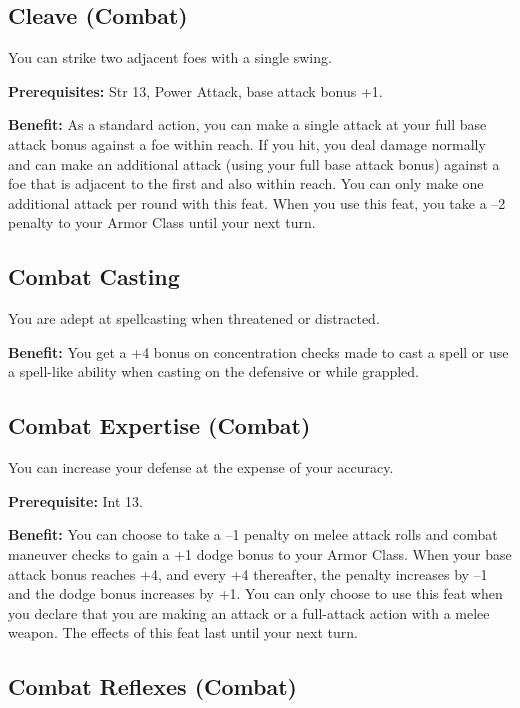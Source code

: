 \subsection{Cleave (Combat)}

				
You can strike two adjacent foes with a single swing.
				
\textbf{Prerequisites:} Str 13, Power Attack, base attack bonus +1.
				
\textbf{Benefit:} As a standard action, you can make a single attack at your full base attack bonus against a foe within reach. If you hit, you deal damage normally and can make an additional attack (using your full base attack bonus) against a foe that is adjacent to the first and also within reach. You can only make one additional attack per round with this feat. When you use this feat, you take a --2 penalty to your Armor Class until your next turn.
				
\subsection{Combat Casting}

				
You are adept at spellcasting when threatened or distracted.
				
\textbf{Benefit:} You get a +4 bonus on concentration checks made to cast a spell or use a spell-like ability when casting on the defensive or while grappled.
				
\subsection{Combat Expertise (Combat)}

				
You can increase your defense at the expense of your accuracy.
				
\textbf{Prerequisite:} Int 13.
				
\textbf{Benefit:} You can choose to take a --1 penalty on melee attack rolls and combat maneuver checks to gain a +1 dodge bonus to your Armor Class. When your base attack bonus reaches +4, and every +4 thereafter, the penalty increases by --1 and the dodge bonus increases by +1. You can only choose to use this feat when you declare that you are making an attack or a full-attack action with a melee weapon. The effects of this feat last until your next turn.
				
\subsection{Combat Reflexes (Combat)}

